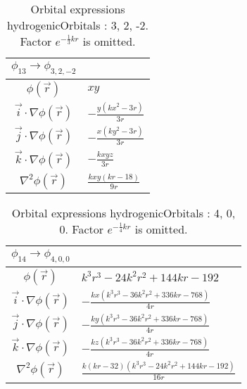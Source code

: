 \begin{table}
\begin{center}
\begin{tabular}{c|l}
$\phi_{13} \rightarrow \phi_{3, 2, -2}$\\
\hline
$\phi(\vec r)$ & $x y$\\
\hline
$\vec i\cdot \nabla \phi(\vec r)$ & $- \frac{y \left(k x^{2} - 3 r\right)}{3 r}$\\
$\vec j\cdot \nabla \phi(\vec r)$ & $- \frac{x \left(k y^{2} - 3 r\right)}{3 r}$\\
$\vec k\cdot \nabla \phi(\vec r)$ & $- \frac{k x y z}{3 r}$\\
\hline
$\nabla^2 \phi(\vec r)$ & $\frac{k x y \left(k r -18\right)}{9 r}$\\
\end{tabular}
\caption{Orbital expressions hydrogenicOrbitals : 3, 2, -2. Factor $e^{- \frac{1}{3} k r}$ is omitted.}
\end{center}
\end{table}


\begin{table}
\begin{center}
\begin{tabular}{c|l}
$\phi_{14} \rightarrow \phi_{4, 0, 0}$\\
\hline
$\phi(\vec r)$ & $k^{3} r^{3} - 24 k^{2} r^{2} + 144 k r -192$\\
\hline
$\vec i\cdot \nabla \phi(\vec r)$ & $- \frac{k x \left(k^{3} r^{3} - 36 k^{2} r^{2} + 336 k r -768\right)}{4 r}$\\
$\vec j\cdot \nabla \phi(\vec r)$ & $- \frac{k y \left(k^{3} r^{3} - 36 k^{2} r^{2} + 336 k r -768\right)}{4 r}$\\
$\vec k\cdot \nabla \phi(\vec r)$ & $- \frac{k z \left(k^{3} r^{3} - 36 k^{2} r^{2} + 336 k r -768\right)}{4 r}$\\
\hline
$\nabla^2 \phi(\vec r)$ & $\frac{k \left(k r -32\right) \left(k^{3} r^{3} - 24 k^{2} r^{2} + 144 k r -192\right)}{16 r}$\\
\end{tabular}
\caption{Orbital expressions hydrogenicOrbitals : 4, 0, 0. Factor $e^{- \frac{1}{4} k r}$ is omitted.}
\end{center}
\end{table}


